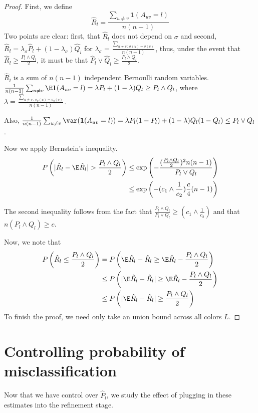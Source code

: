 \documentclass{article}
\begin{document}
\begin{proof}

First, we define
\[
\hat{R}_l = \frac{\sum_{u \neq v} \mathbf{1}(A_{uv} = l)}{n(n-1)}
\]
Two points are clear: first, that $\hat{R}_l$ does not depend on $\sigma$ and second, $\hat{R}_l = \lambda_\sigma \hat{P}_l + (1- \lambda_\sigma) \hat{Q}_l$ for $\lambda_\sigma = \frac{\sum_{u \neq v \,:\, \sigma(u) = \sigma(v)}}{n(n-1)}$, thus, under the event that $\hat{R}_l \geq \frac{P_l \wedge Q_l}{2} $, it must be that $\hat{P}_l \vee \hat{Q}_l \geq \frac{P_l \wedge Q_l}{2}$. 

$\hat{R}_l$ is a sum of $n (n-1)$ independent Bernoulli random variables. $\frac{1}{n(n-1)} \sum_{u\neq v} \E \mathbf{1}(A_{uv} = l) = \lambda P_l + (1 - \lambda) Q_l \geq P_l \wedge Q_l$, where $\lambda = \frac{\sum_{u \neq v \,:\, \sigma_0(u) = \sigma_0(v)}}{n(n-1)}$. 

Also, $\frac{1}{n(n-1)} \sum_{u\neq v} \var( \mathbf{1}(A_{uv}= l) ) = \lambda P_l (1-P_l) + (1-\lambda) Q_l (1-Q_l) \leq P_l \vee Q_l$.  

Now we apply Bernstein's inequality.
\begin{align*}
P\left( | \hat{R}_l - \E \hat{R}_l | > \frac{P_l \wedge Q_l}{2} \right) &\leq
  \exp\left( - \frac{ (\frac{P_l \wedge Q_l}{2} )^2 n(n-1)}
                 {P_l \vee Q_l} \right) \\
  &\leq \exp\left( - (c_1 \wedge \frac{1}{c_2}) \frac{c}{4} (n-1) \right) 
\end{align*}

The second inequality follows from the fact that $\frac{P_l \wedge Q_l}{P_l \vee Q_l} \geq (c_1 \wedge \frac{1}{c_2}) $ and that $n(P_l \wedge Q_l) \geq c$. 

Now, we note that
\begin{align*}
P\left( \hat{R}_l \leq \frac{P_l \wedge Q_l}{2} \right) &=
  P\left( \E\hat{R}_l - \hat{R}_l \geq \E\hat{R}_l - \frac{P_l \wedge Q_l}{2} \right) \\
 &\leq P \left( | \E\hat{R}_l - \hat{R}_l | \geq \E\hat{R}_l - \frac{P_l \wedge Q_l}{2} \right) \\
 &\leq P \left( | \E\hat{R}_l - \hat{R}_l | \geq \frac{P_l \wedge Q_l}{2} \right)
\end{align*}
To finish the proof, we need only take an union bound across all colors $L$. 

\end{proof}


\newpage
\section{Controlling probability of misclassification}
\label{sec:misclassify}
Now that we have control over $\hat{P}_l$, we study the effect of plugging in these estimates into the refinement stage.
\end{document}
